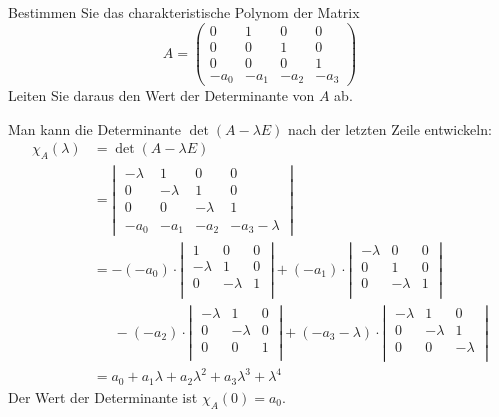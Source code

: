 Bestimmen Sie das charakteristische Polynom der Matrix
\[
A=\begin{pmatrix}
       0&       1&       0&       0\\
       0&       0&       1&       0\\
       0&       0&       0&       1\\
-a_0    &-a_1    &-a_2    &-a_3
\end{pmatrix}
\]
Leiten Sie daraus den Wert der Determinante von $A$ ab.

\begin{loesung}
Man kann die Determinante $\det(A-\lambda E)$ nach der letzten Zeile
entwickeln:
\begin{align*}
\chi_A(\lambda)&=\det(A-\lambda E)\\
&=\left|\;\begin{matrix}
-\lambda&       1&       0&       0\\
       0&-\lambda&       1&       0\\
       0&       0&-\lambda&       1\\
-a_0    &-a_1    &-a_2    &-a_3-\lambda
\end{matrix}\;\right|
\\
&=
-(-a_0)\cdot
\left|\;\begin{matrix}
       1&       0&       0\\
-\lambda&       1&       0\\
       0&-\lambda&       1\\
\end{matrix}\;\right|
+(-a_1)\cdot
\left|\;\begin{matrix}
-\lambda&       0&       0\\
       0&       1&       0\\
       0&-\lambda&       1\\
\end{matrix}\;\right|
\\
&\phantom{=}\,
-(-a_2)\cdot
\left|\;\begin{matrix}
-\lambda&       1&       0\\
       0&-\lambda&       0\\
       0&       0&       1\\
\end{matrix}\;\right|
+(-a_3-\lambda)\cdot
\left|\;\begin{matrix}
-\lambda&       1&       0\\
       0&-\lambda&       1\\
       0&       0&-\lambda\\
\end{matrix}\;\right|
\\
&=a_0+a_1\lambda+a_2\lambda^2+a_3\lambda^3+\lambda^4
\end{align*}
Der Wert der Determinante ist $\chi_A(0)=a_0$.
\end{loesung}

